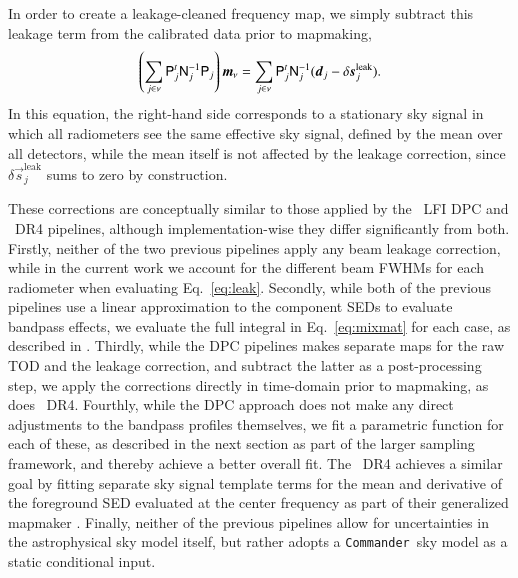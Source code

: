 \documentclass[twocolumn]{aa}
\def\commander{\texttt{Commander}}
\renewcommand{\d}[0]{\vec{d}}
\newcommand{\s}[0]{\vec{s}}
\newcommand{\m}[0]{\vec{m}}
\newcommand{\N}[0]{\tens{N}}
\renewcommand{\P}[0]{\tens{P}}
\newcommand{\?}[1]{\textcolor{red}{{\bf [#1]}}}
\begin{document}
In order to create a leakage-cleaned frequency map, we simply subtract
this leakage term from the calibrated data prior to mapmaking,
\begin{equation}
  \left(\sum_{j \in \nu} \P_j^t \N_{j}^{-1} \P_j\right) \m_{\nu} =
  \sum_{j \in \nu} \P_j^t \N_j^{-1}(\d_j -
  \delta\s^{\mathrm{leak}}_j).
  \label{eq:mapmaking_corr}
\end{equation}
In this equation, the right-hand side corresponds to a stationary sky
signal in which all radiometers see the same effective sky signal,
defined by the mean over all detectors, while the mean itself is not
affected by the leakage correction, since $\delta
\s^{\mathrm{leak}}_{j}$ sums to zero by construction.

These corrections are conceptually similar to those applied by the
\Planck\ LFI DPC \citep{planck2014-a03,planck2016-l02} and
\Planck\ DR4 \citep{npipe} pipelines, although implementation-wise they
differ significantly from both. Firstly, neither of the two previous
pipelines apply any beam leakage correction, while in the current work
we account for the different beam FWHMs for each radiometer
\citep{planck2014-a04} when evaluating Eq.~\eqref{eq:leak}. Secondly,
while both of the previous pipelines use a linear approximation to
the component SEDs to evaluate bandpass effects, we evaluate the full
integral in Eq.~\eqref{eq:mixmat} for each case, as described in
\citet{bp03}. Thirdly, while the DPC pipelines makes separate maps for
the raw TOD and the leakage correction, and subtract the latter as a
post-processing step, we apply the corrections directly in time-domain
prior to mapmaking, as does \Planck\ DR4. Fourthly, while the DPC
approach does not make any direct adjustments to the bandpass profiles
themselves, we fit a parametric function for each of these, as
described in the next section as part of the larger sampling
framework, and thereby achieve a better overall fit. The \Planck\ DR4
achieves a similar goal by fitting separate sky signal template terms
for the mean and derivative of the foreground SED evaluated at the
center frequency as part of their generalized mapmaker
\citep{npipe}. Finally, neither of the previous pipelines
allow for uncertainties in the astrophysical sky model itself, but
rather adopts a \commander\ sky model as a static conditional input.
\end{document}
